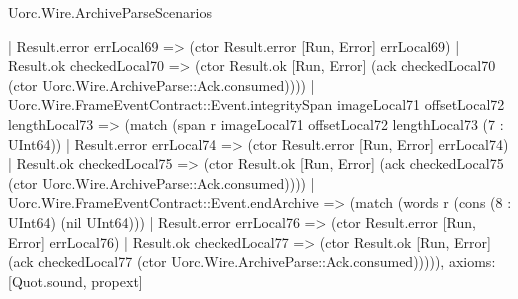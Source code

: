 \begin{lexlean}{Uorc.Wire.ArchiveParseScenarios}
\begin{semanticmodule}
{      | Result.error errLocal69 => (ctor Result.error [Run, Error] errLocal69)
      | Result.ok checkedLocal70 => (ctor Result.ok [Run, Error] (ack checkedLocal70 (ctor Uorc.Wire.ArchiveParse::Ack.consumed))))
    | Uorc.Wire.FrameEventContract::Event.integritySpan imageLocal71 offsetLocal72 lengthLocal73 => (match (span r imageLocal71 offsetLocal72 lengthLocal73 (7 : UInt64))
      | Result.error errLocal74 => (ctor Result.error [Run, Error] errLocal74)
      | Result.ok checkedLocal75 => (ctor Result.ok [Run, Error] (ack checkedLocal75 (ctor Uorc.Wire.ArchiveParse::Ack.consumed))))
    | Uorc.Wire.FrameEventContract::Event.endArchive => (match (words r (cons (8 : UInt64) (nil UInt64)))
      | Result.error errLocal76 => (ctor Result.error [Run, Error] errLocal76)
      | Result.ok checkedLocal77 => (ctor Result.ok [Run, Error] (ack checkedLocal77 (ctor Uorc.Wire.ArchiveParse::Ack.consumed))))),
  axioms: [Quot.sound, propext]
}


\end{semanticmodule}
\end{lexlean}
